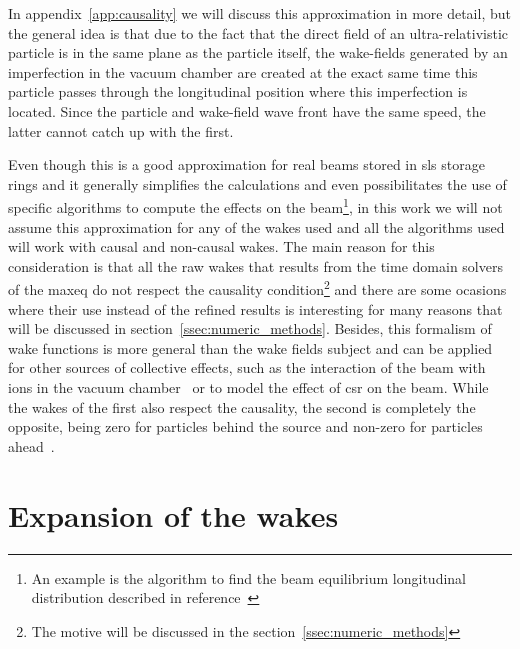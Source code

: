    In appendix~\ref{app:causality} we will discuss this approximation in more detail, but the general idea is that due to the fact that the direct field of an ultra-relativistic particle is in the same plane as the particle itself, the wake-fields generated by an imperfection in the vacuum chamber are created at the exact same time this particle passes through the longitudinal position where this imperfection is located. Since the particle and wake-field wave front have the same speed, the latter cannot catch up with the first.

    Even though this is a good approximation for real beams stored in \gls{sls} storage rings and it generally simplifies the calculations and even possibilitates the use of specific algorithms to compute the effects on the beam\footnote{An example is the algorithm to find the beam equilibrium longitudinal distribution described in reference~\cite{bane}}, in this work we will not assume this approximation for any of the wakes used and all the algorithms used will work with causal and non-causal wakes. The main reason for this consideration is that all the raw wakes that results from the time domain solvers of the \gls{maxeq} do not respect the causality condition\footnote{The motive will be discussed in the section~\ref{ssec:numeric_methods}} and there are some ocasions where their use instead of the refined results is interesting for many reasons that will be discussed in section~\ref{ssec:numeric_methods}. Besides, this formalism of wake functions is more general than the wake fields subject and can be applied for other sources of collective effects, such as the interaction of the beam with ions in the vacuum chamber~\cite{zimerman} or to model the effect of \gls{csr} on the beam. While the wakes of the first also respect the causality, the second is completely the opposite, being zero for particles behind the source and non-zero for particles ahead~\cite{csrpaper}.

\section{Expansion of the wakes}

